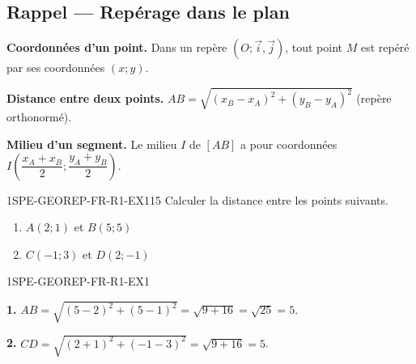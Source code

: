 

\subsection*{Rappel — Repérage dans le plan}

\textbf{Coordonnées d'un point.} Dans un repère $(O ; \vec{i}, \vec{j})$, tout point $M$ est repéré par ses coordonnées $(x ; y)$.

\textbf{Distance entre deux points.} $AB = \sqrt{(x_B - x_A)^2 + (y_B - y_A)^2}$ (repère orthonormé).

\textbf{Milieu d'un segment.} Le milieu $I$ de $[AB]$ a pour coordonnées $I\!\left(\dfrac{x_A + x_B}{2} ; \dfrac{y_A + y_B}{2}\right)$.


\begin{exercice}{1SPE-GEOREP-FR-R1-EX1}{1}{5}
Calculer la distance entre les points suivants.
\begin{enumerate}
  \item $A(2 ; 1)$ et $B(5 ; 5)$
  \item $C(-1 ; 3)$ et $D(2 ; -1)$
\end{enumerate}
\end{exercice}


\begin{corrige}{1SPE-GEOREP-FR-R1-EX1}

\textbf{1.} $AB = \sqrt{(5-2)^2 + (5-1)^2} = \sqrt{9+16} = \sqrt{25} = 5$.

\textbf{2.} $CD = \sqrt{(2+1)^2 + (-1-3)^2} = \sqrt{9+16} = 5$.

\end{corrige}

